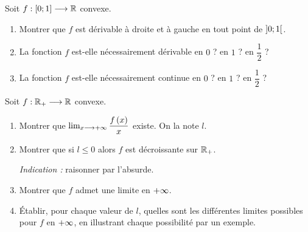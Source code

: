 \begin{corr}
\end{corr}

\begin{exo}
Soit \(f:\left[0;1\right]\longrightarrow\mathbb{R}\) convexe.

\begin{enumerate}
\item Montrer que \(f\) est dérivable à droite et à gauche en tout point de \(\left]0;1\right[\). \\

\item La fonction \(f\) est-elle nécessairement dérivable en \(0\) ? en \(1\) ? en \(\dfrac{1}{2}\) ? \\

\item La fonction \(f\) est-elle nécessairement continue en \(0\) ? en \(1\) ? en \(\dfrac{1}{2}\) ?
\end{enumerate}
\end{exo}

\begin{corr}
\end{corr}

\begin{exo}
Soit \(f:\mathbb{R}_+\longrightarrow\mathbb{R}\) convexe.

\begin{enumerate}
\item Montrer que \(\lim_{x\longrightarrow+\infty}\dfrac{f\left(x\right)}{x}\) existe. On la note \(l\). \\

\item Montrer que si \(l\leq0\) alors \(f\) est décroissante sur \(\mathbb{R}_+\).

\textit{Indication :} raisonner par l'absurde. \\

\item Montrer que \(f\) admet une limite en \(+\infty\). \\

\item Établir, pour chaque valeur de \(l\), quelles sont les différentes limites possibles pour \(f\) en \(+\infty\), en illustrant chaque possibilité par un exemple.
\end{enumerate}
\end{exo}

\begin{corr}
\end{corr}

